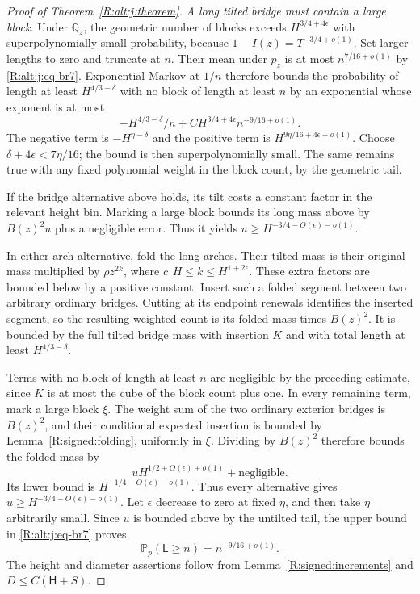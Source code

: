 \begin{proof}[Proof of Theorem~\ref{R:alt:j:theorem}]
\emph{A long tilted bridge must contain a large block.}
Under $\mathbb Q_z$, the geometric number of blocks exceeds
$H^{3/4+4\epsilon}$ with superpolynomially small probability, because
$1-I(z)=T^{-3/4+o(1)}$. Set larger lengths to zero and truncate at $n$.
Their mean under $p_z$ is at most $n^{7/16+o(1)}$ by
\eqref{R:alt:j:eq-br7}. Exponential Markov at $1/n$ therefore bounds
the probability of length at least $H^{4/3-\delta}$ with no block of
length at least $n$ by an exponential whose exponent is at most
\[
 -H^{4/3-\delta}/n
       +CH^{3/4+4\epsilon}n^{-9/16+o(1)}.
\]
The negative term is $-H^{\eta-\delta}$ and the positive term is
$H^{9\eta/16+4\epsilon+o(1)}$. Choose
$\delta+4\epsilon<7\eta/16$; the bound is then superpolynomially small.
The same remains true with any fixed polynomial weight in the block
count, by the geometric tail.

If the bridge alternative above holds, its tilt costs a constant factor
in the relevant height bin. Marking a large block bounds its long mass
above by $B(z)^2u$ plus a negligible error. Thus it yields
$u\ge H^{-3/4-O(\epsilon)-o(1)}$.

In either arch alternative, fold the long arches. Their tilted mass is
their original mass multiplied by $\rho z^{2k}$, where
$c_1H\le k\le H^{1+2\epsilon}$. These extra factors are bounded below
by a positive constant. Insert such a folded segment between two arbitrary
ordinary bridges. Cutting at its endpoint renewals identifies the inserted
segment, so the resulting weighted count is its folded mass times $B(z)^2$.
It is bounded by the full tilted bridge mass with insertion $K$ and with
total length at least $H^{4/3-\delta}$.

Terms with no block of length at least $n$ are negligible by the preceding
estimate, since $K$ is at most the cube of the block count plus one.
In every remaining term, mark a large block $\xi$. The weight sum of the
two ordinary exterior bridges is $B(z)^2$, and their conditional expected
insertion is bounded by Lemma~\ref{R:signed:folding}, uniformly in $\xi$.
Dividing by $B(z)^2$ therefore bounds the folded mass by
\[
 uH^{1/2+O(\epsilon)+o(1)}+\text{negligible}.
\]
Its lower bound is $H^{-1/4-O(\epsilon)-o(1)}$. Thus every alternative
gives $u\ge H^{-3/4-O(\epsilon)-o(1)}$. Let $\epsilon$ decrease to zero
at fixed $\eta$, and then take $\eta$ arbitrarily small. Since $u$ is
bounded above by the untilted tail, the upper bound in
\eqref{R:alt:j:eq-br7} proves
\begin{equation}\label{R:alt:j:eq-len}
 \mathbb P_p(\mathsf L\ge n)=n^{-9/16+o(1)}.
\end{equation}
The height and diameter assertions follow from
Lemma~\ref{R:signed:increments} and $D\le C(\mathsf H+S)$.


\end{proof}
